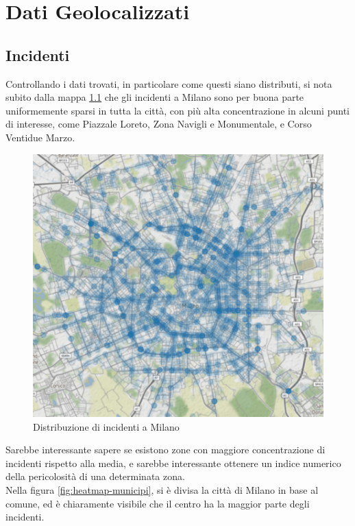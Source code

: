\documentclass[a4paper]{report}
\begin{document}
\chapter{Dati Geolocalizzati}

\section{Incidenti}

Controllando i dati trovati, in particolare come questi siano distributi, 
si nota subito dalla mappa \ref{fig:geo-incidenti} che gli incidenti a Milano sono per buona parte uniformemente sparsi in tutta la città, 
con più alta concentrazione in alcuni punti di interesse, come Piazzale Loreto, Zona Navigli 
e Monumentale, e Corso Ventidue Marzo.

\begin{figure}
    \includegraphics[width=\linewidth]{../src/incidenti/geo_incidenti.png}
    \caption{Distribuzione di incidenti a Milano}
    \label{fig:geo-incidenti}
\end{figure}

Sarebbe interessante sapere se esistono zone con maggiore concentrazione di incidenti rispetto 
alla media, e sarebbe interessante ottenere un indice numerico della pericolosità di una 
determinata zona.\\
Nella figura \ref{fig:heatmap-municipi}, si è divisa la città di Milano in base al comune, ed è 
chiaramente visibile che il centro ha la maggior parte degli incidenti.
\end{document}
